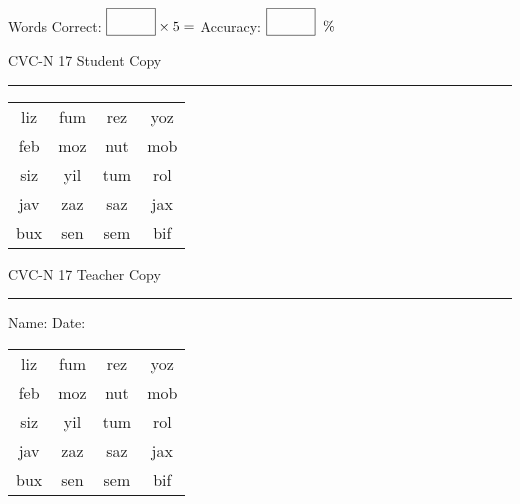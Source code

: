 \documentclass{memoir}
\begin{document}
\small

Words Correct: $\fbox{\phantom{\huge 100}} \times 5 = $ Accuracy: $\fbox{\phantom{\huge 100}}\;\; \%$ 

\vfill

\newpage


\footnotesize \noindent
CVC-N 17 \hfill Student Copy
\smallskip
\hrule

\Large

\setlength{\tabcolsep}{14pt}
\def\arraystretch{2}

{\selectfont


\begin{vplace}[0.5]
\begin{center}
\begin{tabular}{cccc}
liz & fum & rez & yoz \\
feb & moz & nut & mob \\
siz & yil & tum & rol \\
jav & zaz & saz & jax \\
bux & sen & sem & bif \\
\end{tabular}
\end{center}
\end{vplace}

}

\newpage

\footnotesize \noindent
CVC-N 17 \hfill Teacher Copy
\smallskip
\hrule

\small

\vfill

\noindent
Name: \underline{\hspace{1.75in}} \hfill Date: \underline{\hspace{1in}}

\Large

{\selectfont


\begin{vplace}[0.5]
\begin{center}
\begin{tabular}{cccc}
liz & fum & rez & yoz \\
feb & moz & nut & mob \\
siz & yil & tum & rol \\
jav & zaz & saz & jax \\
bux & sen & sem & bif \\
\end{tabular}
\end{center}
\end{vplace}



}
\end{document}
